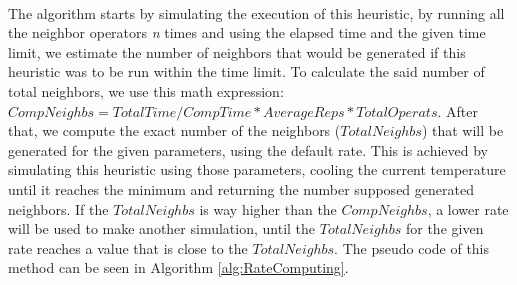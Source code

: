 \\
The algorithm starts by simulating the execution of this heuristic, by running all the neighbor operators \textit{n} times and using the elapsed time and the given time limit, we estimate the number of neighbors that would be generated if this heuristic was to be run within the time limit. To calculate the said number of total neighbors, we use this math expression: $CompNeighbs = TotalTime / CompTime * AverageReps * TotalOperats$. After that, we compute the exact number of the neighbors ($TotalNeighbs$) that will be generated for the given parameters, using the default rate. This is achieved by simulating this heuristic using those parameters, cooling the current temperature until it reaches the minimum and returning the number supposed generated neighbors. If the $TotalNeighbs$ is way higher than the $CompNeighbs$, a lower rate will be used to make another simulation, until the $TotalNeighbs$ for the given rate reaches a value that is close to the $TotalNeighbs$. The pseudo code of this method can be seen in Algorithm \ref{alg:RateComputing}.\\
\\
